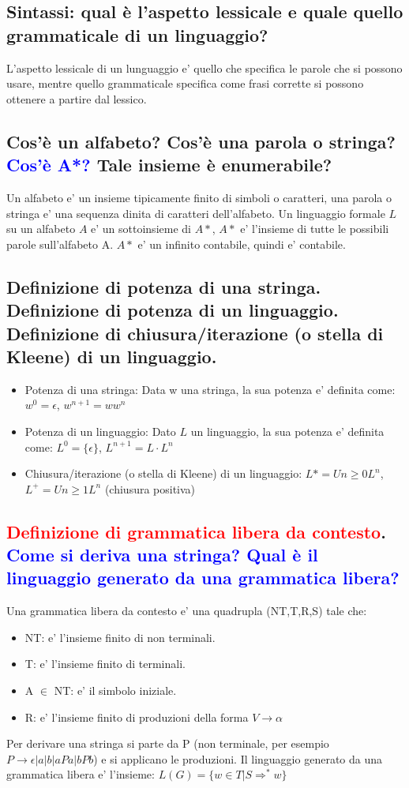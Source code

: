 \documentclass{article}
\begin{document}
\subsection{Sintassi: qual è l'aspetto lessicale e quale quello grammaticale di un linguaggio?}
L'aspetto lessicale di un lunguaggio e' quello che specifica le parole che si
possono usare, mentre quello grammaticale specifica come frasi corrette si
possono ottenere a partire dal lessico.
\subsection{Cos'è un alfabeto? Cos'è una parola o stringa? \textcolor{blue}{Cos'è A*?} Tale insieme è enumerabile?}
Un alfabeto e' un insieme tipicamente finito di simboli o caratteri, una parola o stringa e' una sequenza dinita di caratteri dell'alfabeto.
Un linguaggio formale $L$ su un alfabeto $A$ e' un sottoinsieme di $A*$, $A*$ e' l'insieme di tutte le possibili parole sull'alfabeto A.
$A*$ e' un infinito contabile, quindi e' contabile.
\subsection{Definizione di potenza di una stringa. Definizione di potenza di un linguaggio. Definizione di chiusura/iterazione (o stella di Kleene) di un linguaggio.}
\begin{itemize}
    \item Potenza di una stringa: Data w una stringa, la sua potenza e' definita come:
          $w^0 = \epsilon$, $w^{n+1} = ww^n$
    \item Potenza di un linguaggio: Dato $L$ un linguaggio, la sua potenza e' definita
          come: $L^0 = \{\epsilon\}$, $L^{n+1}=L \cdot L^n$
    \item Chiusura/iterazione (o stella di Kleene) di un linguaggio: $L*=U{n \geq 0}
              L^n$, $L^+ = U{n \geq 1} L^n$ (chiusura positiva)
\end{itemize}
\subsection{\textcolor{red}{Definizione di grammatica libera da contesto}. \textcolor{blue}{Come si deriva una stringa? Qual è il linguaggio generato da una grammatica libera?}}
Una grammatica libera da contesto e' una quadrupla (NT,T,R,S) tale che:
\begin{itemize}
    \item NT: e' l'insieme finito di non terminali.
    \item T: e' l'insieme finito di terminali.
    \item A $\in$ NT: e' il simbolo iniziale.
    \item R: e' l'insieme finito di produzioni della forma $V \to \alpha$
\end{itemize}
Per derivare una stringa si parte da P (non terminale, per esempio $P \to \epsilon | a | b | aPa | bPb$) e si applicano le produzioni.
Il linguaggio generato da una grammatica libera e' l'insieme: $L(G) = \{w \in T | S \Rightarrow^* w\}$
\end{document}
